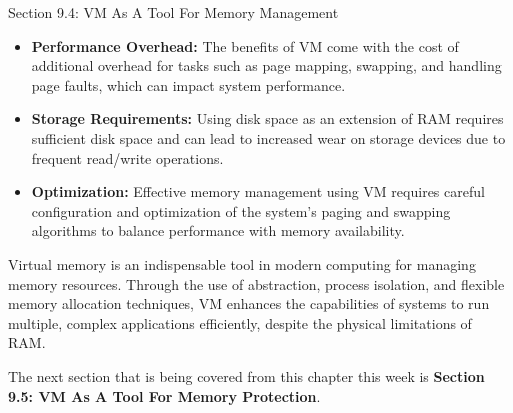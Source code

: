 \begin{notes}{Section 9.4: VM As A Tool For Memory Management}
    \begin{itemize}
        \item \textbf{Performance Overhead:} The benefits of VM come with the cost of additional overhead for tasks such as page mapping, swapping, and handling page faults, which can impact system performance.
        \item \textbf{Storage Requirements:} Using disk space as an extension of RAM requires sufficient disk space and can lead to increased wear on storage devices due to frequent read/write operations.
        \item \textbf{Optimization:} Effective memory management using VM requires careful configuration and optimization of the system's paging and swapping algorithms to balance performance with memory availability.
    \end{itemize}
    
    Virtual memory is an indispensable tool in modern computing for managing memory resources. Through the use of abstraction, process isolation, and flexible memory allocation techniques, VM enhances 
    the capabilities of systems to run multiple, complex applications efficiently, despite the physical limitations of RAM.    
\end{notes}

The next section that is being covered from this chapter this week is \textbf{Section 9.5: VM As A Tool For Memory Protection}.


